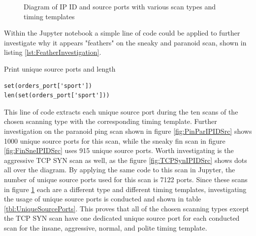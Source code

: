 \begin{figure}[!ht]
    \caption{Diagram of IP ID and source ports with various scan types and timing templates}%
    \label{fig:IPIDSrcPort}%
\end{figure}

Within the Jupyter notebook a simple line of code could be applied to further investigate why it appears "feathers" on the sneaky and paranoid scan, shown in listing \ref{lst:FeatherInvestigation}.

\begin{listing}[!ht]
\caption{Print unique source ports and length}
\label{lst:FeatherInvestigation}
\begin{verbatim}
set(orders_port['sport'])
len(set(orders_port['sport']))
\end{verbatim}
\end{listing}

This line of code extracts each unique source port during the ten scans of the chosen scanning type with the corresponding timing template.
Further investigation on the paranoid ping scan shown in figure \ref{fig:PinParIPIDSrc} shows 1000 unique source ports for this scan, while the sneaky fin scan in figure \ref{fig:FinSneIPIDSrc} uses 915 unique source ports.
Worth investigating is the aggressive TCP SYN scan as well, as the figure \ref{fig:TCPSynIPIDSrc} shows dots all over the diagram.
By applying the same code to this scan in Jupyter, the number of unique source ports used for this scan is 7122 ports.
Since these scans in figure \ref{fig:IPIDSrcPort} each are a different type and different timing templates, investigating the usage of unique source ports is conducted and shown in table \ref{tbl:UniqueSourcePorts}.
This proves that all of the chosen scanning types except the TCP SYN scan have one dedicated unique source port for each conducted scan for the insane, aggressive, normal, and polite timing template.


